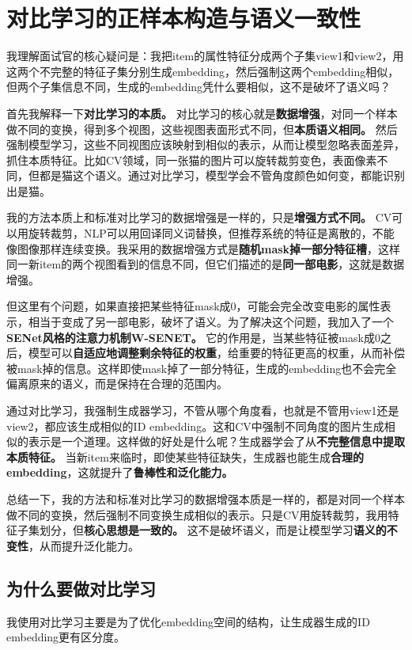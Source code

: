 \documentclass[UTF8]{ctexart}
\begin{document}
\section{对比学习的正样本构造与语义一致性}
我理解面试官的核心疑问是：我把item的属性特征分成两个子集view1和view2，用这两个不完整的特征子集分别生成embedding，然后强制这两个embedding相似，但两个子集信息不同，生成的embedding凭什么要相似，这不是破坏了语义吗？

首先我解释一下\textbf{对比学习的本质。} 对比学习的核心就是\textbf{数据增强}，对同一个样本做不同的变换，得到多个视图，这些视图表面形式不同，但\textbf{本质语义相同。} 然后强制模型学习，这些不同视图应该映射到相似的表示，从而让模型忽略表面差异，抓住本质特征。比如CV领域，同一张猫的图片可以旋转裁剪变色，表面像素不同，但都是猫这个语义。通过对比学习，模型学会不管角度颜色如何变，都能识别出是猫。

我的方法本质上和标准对比学习的数据增强是一样的，只是\textbf{增强方式不同。} CV可以用旋转裁剪，NLP可以用回译同义词替换，但推荐系统的特征是离散的，不能像图像那样连续变换。我采用的数据增强方式是\textbf{随机mask掉一部分特征槽}，这样同一新item的两个视图看到的信息不同，但它们描述的是\textbf{同一部电影}，这就是数据增强。

但这里有个问题，如果直接把某些特征mask成0，可能会完全改变电影的属性表示，相当于变成了另一部电影，破坏了语义。为了解决这个问题，我加入了一个\textbf{SENet风格的注意力机制W-SENET。} 它的作用是，当某些特征被mask成0之后，模型可以\textbf{自适应地调整剩余特征的权重}，给重要的特征更高的权重，从而补偿被mask掉的信息。这样即使mask掉了一部分特征，生成的embedding也不会完全偏离原来的语义，而是保持在合理的范围内。

通过对比学习，我强制生成器学习，不管从哪个角度看，也就是不管用view1还是view2，都应该生成相似的ID embedding。这和CV中强制不同角度的图片生成相似的表示是一个道理。这样做的好处是什么呢？生成器学会了从\textbf{不完整信息中提取本质特征。} 当新item来临时，即使某些特征缺失，生成器也能生成\textbf{合理的embedding}，这就提升了\textbf{鲁棒性和泛化能力。}

总结一下，我的方法和标准对比学习的数据增强本质是一样的，都是对同一个样本做不同的变换，然后强制不同变换生成相似的表示。只是CV用旋转裁剪，我用特征子集划分，但\textbf{核心思想是一致的。} 这不是破坏语义，而是让模型学习\textbf{语义的不变性}，从而提升泛化能力。

\subsection{为什么要做对比学习}
我使用对比学习主要是为了优化embedding空间的结构，让生成器生成的ID embedding更有区分度。
\end{document}
